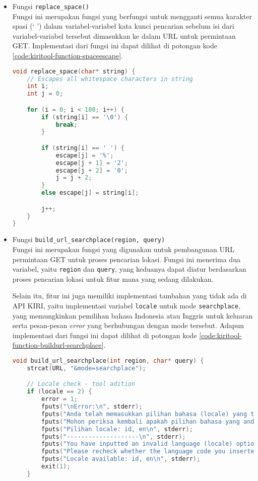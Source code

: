 \begin{itemize}[listparindent=\parindent]
	\item Fungsi \verb|replace_space()| \\
	Fungsi ini merupakan fungsi yang berfungsi untuk mengganti semua karakter spasi (` ') dalam variabel-variabel kata kunci pencarian sebelum isi dari variabel-variabel tersebut dimasukkan ke dalam URL untuk permintaan GET. Implementasi dari fungsi ini dapat dilihat di potongan kode \ref{code:kiritool-function-spaceescape}.
	
	\begin{lstlisting}[language=C, caption=Implementasi fungsi print\textunderscore help(), label=code:kiritool-function-spaceescape]
void replace_space(char* string) {
    // Escapes all whitespace characters in string
    int i;
    int j = 0;

    for (i = 0; i < 100; i++) {
        if (string[i] == '\0') {
            break;
        }

        if (string[i] == ' ') {
            escape[j] = '%';
            escape[j + 1] = '2';
            escape[j + 2] = '0';
            j = j + 2;
        }
        else escape[j] = string[i];

        j++;
    }
}
	\end{lstlisting}
	
	\item Fungsi \verb|build_url_searchplace(region, query)| \\
	Fungsi ini merupakan fungsi yang digunakan untuk pembangunan URL permintaan	GET untuk proses pencarian lokasi. Fungsi ini menerima dua variabel, yaitu \verb|region| dan \verb|query|, yang keduanya dapat diatur berdasarkan proses pencarian lokasi untuk fitur mana yang sedang dilakukan. 
	
	Selain itu, fitur ini juga memiliki implementasi tambahan yang tidak ada di API KIRI, yaitu implementasi variabel \verb|locale| untuk mode \verb|searchplace|, yang memungkinkan pemilihan bahasa Indonesia atau Inggris untuk keluaran serta pesan-pesan \textit{error} yang berhubungan dengan mode tersebut. Adapun implementasi dari fungsi ini dapat dilihat di potongan kode \ref{code:kiritool-function-buildurl-searchplace}.
	
	\begin{lstlisting}[language=C, caption=Implementasi fungsi build\textunderscore url\textunderscore searchplace(), label=code:kiritool-function-buildurl-searchplace]
	void build_url_searchplace(int region, char* query) {
    strcat(URL, "&mode=searchplace");

    // Locale check - tool adition
    if (locale == 2) {
        error = 1;
        fputs("\nError:\n", stderr);
        fputs("Anda telah memasukkan pilihan bahasa (locale) yang tidak valid.\n", stderr);
        fputs("Mohon periksa kembali apakah pilihan bahasa yang anda masukkan valid atau tidak.\n", stderr);
        fputs("Pilihan locale: id, en\n", stderr);
        fputs("--------------------\n", stderr);
        fputs("You have inputted an invalid language (locale) option.\n", stderr);
        fputs("Please recheck whether the language code you inserted was supported or not.\n", stderr);
        fputs("Locale available: id, en\n", stderr);
        exit(1);
    }


\end{lstlisting}
\end{itemize}
